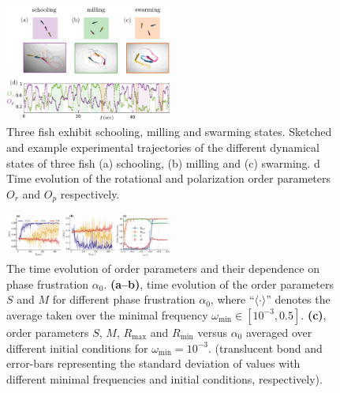 \documentclass[a4paper, amsfonts, amssymb, amsmath, reprint, showkeys, showpacs, nofootinbib, twoside]{revtex4-2}
\begin{document}
\begin{figure}
    \includegraphics[width=0.49\textwidth]{./figs/rotationalOrderParameter.png}
    \caption{
        \label{fig:rotationalOrderParameter}
        Three fish exhibit schooling, milling and swarming states. Sketched and example experimental trajectories of the different dynamical states of three fish (a)
        schooling, (b) milling and (c) swarming. d Time evolution of the rotational and polarization order parameters $O_r$ and $O_p$ respectively.
    }
\end{figure}

\begin{figure}
    \centering
    \includegraphics[width=0.49\textwidth]{./figs/orderParameters.pdf}
    \caption{
        \label{fig:orderParameters} 
        The time evolution of order parameters and their dependence on phase frustration $\alpha_0$.
        \textbf{(a--b)}, time evolution of the order parameters $S$ and $M$ for different phase frustration $\alpha_0$, where \enquote{$\langle\cdot\rangle$} denotes the average taken over the minimal frequency $\omega_{\min}\in\left[10^{-3}, 0.5\right]$.
        \textbf{(c)}, order parameters $S$, $M$, $R_{\max}$ and $R_{\min}$ versus $\alpha_0$ averaged over different initial conditions for $\omega_{\min}=10^{-3}$.
        (translucent bond and error-bars representing the standard deviation of values with different minimal frequencies and initial conditions, respectively).
    }
\end{figure}
\end{document}
